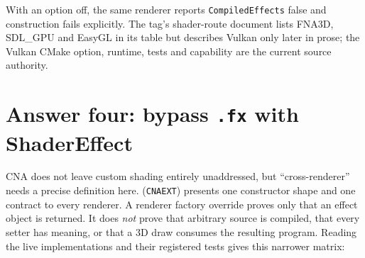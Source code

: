 With an option off, the same renderer reports \texttt{CompiledEffects} false and construction
fails explicitly. The tag's shader-route document lists FNA3D, SDL\_GPU and EasyGL in its table but
describes Vulkan only later in prose; the Vulkan CMake option, runtime, tests and capability are
the current source authority.

\section{Answer four: bypass \texttt{.fx} with ShaderEffect}

CNA does not leave custom shading entirely unaddressed, but ``cross-renderer'' needs a precise
definition here.  (\texttt{CNAEXT}) presents one constructor shape and
one  contract to every renderer. A renderer factory override proves
only that an effect object is returned. It does \emph{not} prove that arbitrary source is
compiled, that every setter has meaning, or that a 3D draw consumes the resulting program.
Reading the live implementations and their registered tests gives this narrower matrix:

